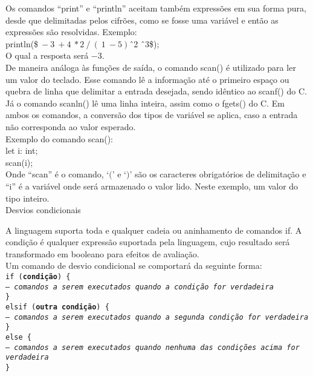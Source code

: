 \documentclass[12pt,a4paper]{article}
\def\emph#1{\textbf{#1}} %
\begin{document}
Os comandos ``print'' e ``println'' aceitam também expressões em sua forma pura, desde que delimitadas pelos cifrões, como se fosse uma variável e então as expressões são resolvidas. Exemplo: \\

println(\$$\ -3\ +4\ *2\ /\ (\ 1\ - 5)$\^\ 2 \^\ 3\$);\\

O qual a resposta será $-3$.\\

De maneira análoga às funções de saída, o comando scan() é utilizado para ler um valor do teclado. Esse comando lê a informação até o primeiro espaço ou quebra de linha que delimitar a entrada desejada, sendo idêntico ao scanf() do C. Já o comando scanln() lê uma linha inteira, assim como o fgets() do C. Em ambos os comandos, a conversão dos tipos de variável se aplica, caso a entrada não corresponda ao valor esperado.\\

Exemplo do comando scan(): \\

let i: int;\\

scan(i);\\

Onde ``scan'' é o comando, `$($' e `$)$' são os caracteres obrigatórios de delimitação e ``i'' é a variável onde será armazenado o valor lido. Neste exemplo, um valor do tipo inteiro.\\


\hypertarget{label4}{\Large{Desvios condicionais}}\\[0.3cm]
\normalsize

A linguagem suporta toda e qualquer cadeia ou aninhamento de comandos if. A condição é qualquer expressão suportada pela linguagem, cujo resultado será transformado em booleano para efeitos de avaliação.\\

Um comando de desvio condicional se comportará da seguinte forma: \\

\noindent\texttt{if (\emph{condição}) \{\\
\indent\textit{-- comandos a serem executados quando a condição for verdadeira} \\
\} \\
elsif (\emph{outra condição}) \{\\
\indent\textit{-- comandos a serem executados quando a segunda condição for verdadeira} \\
\} \\
else \{\\
\indent\textit{-- comandos a serem executados quando nenhuma das condições acima for verdadeira} \\
\}}\\
\end{document}
